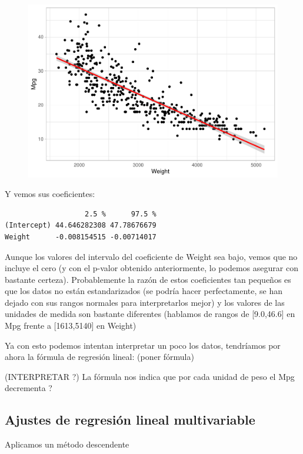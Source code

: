 \begin{figure}[H]\includegraphics[width=.9\linewidth]{img/Regresion_files/figure-latex/unnamed-chunk-6-1} \caption{}\end{figure}

Y vemos sus coeficientes:

\begin{verbatim}
                   2.5 %      97.5 %
(Intercept) 44.646282308 47.78676679
Weight      -0.008154515 -0.00714017
\end{verbatim}

Aunque los valores del intervalo del coeficiente de Weight sea bajo, vemos que no incluye el cero (y con el p-valor obtenido anteriormente, lo podemos asegurar con bastante certeza). Probablemente la razón de estos coeficientes tan pequeños es que los datos no están estandarizados (se podría hacer perfectamente, se han dejado con sus rangos normales para interpretarlos mejor) y los valores de las unidades de medida son bastante diferentes (hablamos de rangos de {[}9.0,46.6{]} en Mpg frente a {[}1613,5140{]} en Weight)

Ya con esto podemos intentan interpretar un poco los datos, tendríamos por ahora la fórmula de regresión lineal: (poner fórmula)

(INTERPRETAR ?) La fórmula nos indica que por cada unidad de peso el Mpg decrementa ?

\subsection{Ajustes de regresión lineal multivariable}

Aplicamos un método descendente

